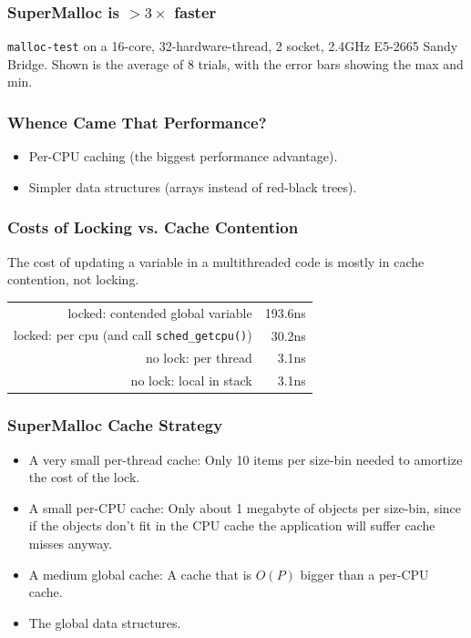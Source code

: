 \documentclass[xcolor=dvipsnames,14pt]{beamer}
\begin{document}
\begin{frame}
\frametitle{SuperMalloc is $>3\times$ faster}

{\small

}

\texttt{malloc-test} on a 16-core, 32-hardware-thread, 2 socket,
2.4GHz E5-2665 Sandy Bridge.  Shown is the average of 8 trials, with
the error bars showing the max and min.

\end{frame}

\begin{frame}
\frametitle{Whence Came That Performance?}

\begin{itemize}
\item Per-CPU caching (the biggest performance advantage).
\item Simpler data structures (arrays instead of red-black trees).
\end{itemize}
\end{frame}

\begin{frame}
\frametitle{Costs of Locking vs. Cache Contention}

The cost of updating a variable in a multithreaded code is mostly in
cache contention, not locking.

\begin{center}
\begin{tabular}{rr}
  locked:                               contended global variable &    193.6ns \\
  locked: per cpu (and call \texttt{sched_getcpu()})  &     30.2ns \\
  no lock:                                              per thread &      3.1ns \\
  no lock:                                          local in stack &      3.1ns \\
\end{tabular}
\end{center}

\end{frame}

\begin{frame}
\frametitle{SuperMalloc Cache Strategy}

\begin{itemize}
\item A very small per-thread cache:  Only 10 items per size-bin needed to amortize the cost of the lock.
\item A small per-CPU cache: Only about 1 megabyte of objects per size-bin, since if the objects don't fit in the CPU cache the application will suffer cache misses anyway.
\item A medium global cache: A cache that is $O(P)$ bigger than a per-CPU cache.
\item The global data structures.
\end{itemize}
\end{frame}
\end{document}

